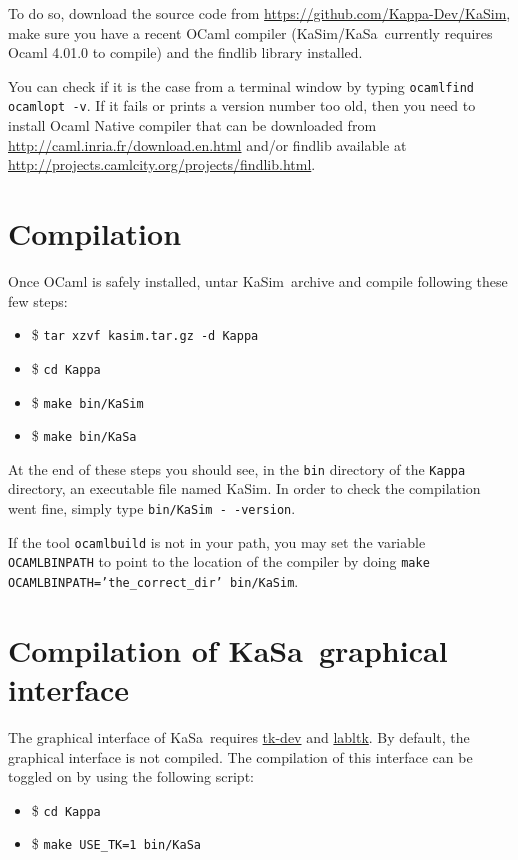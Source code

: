 \documentclass[11pt]{book}
\def\KaSim{\textsf{KaSim}}
\def\KaSa{\textsf{KaSa}}
\def\ttt#1{\texttt{#1}}
\def\ITE#1{\begin{itemize}#1\end{itemize}}
\begin{document}
To do so, download the source code from
\url{https://github.com/Kappa-Dev/KaSim}, make sure you have a recent
OCaml compiler (\KaSim/\KaSa~currently requires Ocaml 4.01.0 to
compile) and the findlib library installed.

You can check if it is the case from a terminal window by typing
\ttt{ocamlfind ocamlopt -v}. If it fails or prints a version number
too old, then you need to install Ocaml Native compiler that can be
downloaded from \url{http://caml.inria.fr/download.en.html} and/or
findlib available at
\url{http://projects.camlcity.org/projects/findlib.html}.

\section{Compilation}
Once OCaml is safely installed, untar \KaSim~archive and compile following these
few steps: \ITE{
\item[\$]\ttt{tar xzvf kasim.tar.gz -d Kappa}
\item[\$]\ttt{cd Kappa}
\item[\$]\ttt{make bin/KaSim}
\item[\$]\ttt{make bin/KaSa}}

At the end of these steps you should see, in the
\ttt{bin} directory of the \ttt{Kappa} directory, an executable file named
KaSim.  In order to check the compilation went fine, simply type
\ttt{bin/KaSim -\,-version}.

If the tool \ttt{ocamlbuild} is not in your path, you may
set the variable \ttt{OCAMLBINPATH} to point to the location of the
compiler by doing \ttt{make OCAMLBINPATH='the\_correct\_dir' bin/KaSim}.

\section{Compilation of KaSa~graphical interface}

The graphical interface of \KaSa~requires \href{http://www.tcl.tk/}{tk-dev} and 
\href{https://forge.ocamlcore.org/projects/labltk/}{labltk}. By default, the graphical interface is not compiled. The compilation of this interface can be toggled on by using the following script: \ITE{
\item[\$]\ttt{cd Kappa}
\item[\$]\ttt{make USE\_TK=1 bin/KaSa}}
\end{document}
